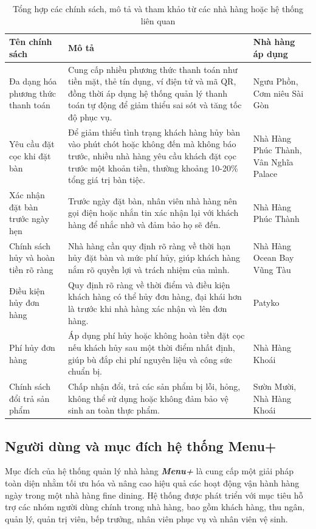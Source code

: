 \begin{table}[H]
\centering
\begin{tabular}{|p{4cm}|p{8cm}|p{4cm}|}
\hline
\textbf{Tên chính sách} & \textbf{Mô tả} & \textbf{Nhà hàng áp dụng} \\
\hline
Đa dạng hóa phương thức thanh toán & Cung cấp nhiều phương thức thanh toán như tiền mặt, thẻ tín dụng, ví điện tử và mã QR, đồng thời áp dụng hệ thống quản lý thanh toán tự động để giảm thiểu sai sót và tăng tốc độ phục vụ. & Ngưu Phồn, Cơm niêu Sài Gòn \\
\hline
Yêu cầu đặt cọc khi đặt bàn & Để giảm thiểu tình trạng khách hàng hủy bàn vào phút chót hoặc không đến mà không báo trước, nhiều nhà hàng yêu cầu khách đặt cọc trước một khoản tiền, thường khoảng 10-20\% tổng giá trị bàn tiệc. & Nhà Hàng Phúc Thành, Vân Nghĩa Palace \\
\hline
Xác nhận đặt bàn trước ngày hẹn & Trước ngày đặt bàn, nhân viên nhà hàng nên gọi điện hoặc nhắn tin xác nhận lại với khách hàng để nhắc nhở và đảm bảo họ sẽ đến. & Nhà Hàng Phúc Thành \\
\hline
Chính sách hủy và hoàn tiền rõ ràng & Nhà hàng cần quy định rõ ràng về thời hạn hủy đặt bàn và mức phí hủy, giúp khách hàng nắm rõ quyền lợi và trách nhiệm của mình. & Nhà Hàng Ocean Bay Vũng Tàu \\
\hline
Điều kiện hủy đơn hàng & Quy định rõ ràng về thời điểm và điều kiện khách hàng có thể hủy đơn hàng, đại khái hơn là trước khi nhà hàng xác nhận và lên đơn hàng. & Patyko \\
\hline
Phí hủy đơn hàng & Áp dụng phí hủy hoặc không hoàn tiền đặt cọc nếu khách hủy sau một thời điểm nhất định, giúp bù đắp chi phí nguyên liệu và công sức chuẩn bị. & Nhà Hàng Khoái \\
\hline
Chính sách đổi trả sản phẩm & Chấp nhận đổi, trả các sản phẩm bị lỗi, hỏng, không thể sử dụng hoặc không đảm bảo vệ sinh an toàn thực phẩm. & Sườn Mười, Nhà Hàng Khoái \\
\hline
\end{tabular}
\caption{Tổng hợp các chính sách, mô tả và tham khảo từ các nhà hàng hoặc hệ thống liên quan}
\end{table}

\subsection{Người dùng và mục đích hệ thống Menu+}

Mục đích của hệ thống quản lý nhà hàng \textbf{\textit{Menu+}} là cung cấp một giải pháp toàn diện nhằm tối ưu hóa và nâng cao hiệu quả các hoạt động vận hành hàng ngày trong một nhà hàng fine dining. Hệ thống được phát triển với mục tiêu hỗ trợ các nhóm người dùng chính trong nhà hàng, bao gồm khách hàng, thu ngân, quản lý, quản trị viên, bếp trưởng, nhân viên phục vụ và nhân viên vệ sinh.

